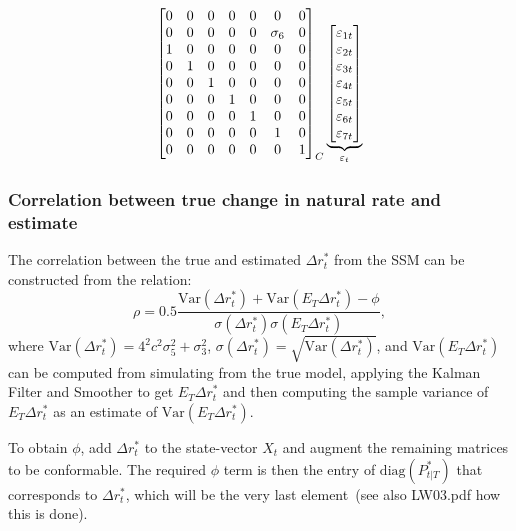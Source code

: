 \documentclass[a4paper,12pt]{article}
\begin{document}
\begin{align}
{\begin{bmatrix}
0 & 0 & 0 & 0 & 0 & 0 & 0 \\ 
0 & 0 & 0 & 0 & 0 & \sigma _{6} & 0 \\ 
1 & 0 & 0 & 0 & 0 & 0 & 0 \\ 
0 & 1 & 0 & 0 & 0 & 0 & 0 \\ 
0 & 0 & 1 & 0 & 0 & 0 & 0 \\ 
0 & 0 & 0 & 1 & 0 & 0 & 0 \\ 
0 & 0 & 0 & 0 & 1 & 0 & 0 \\ 
0 & 0 & 0 & 0 & 0 & 1 & 0 \\ 
0 & 0 & 0 & 0 & 0 & 0 & 1%
\end{bmatrix}%
}_{C}\underbrace{%
\begin{bmatrix}
\varepsilon _{1t} \\ 
\varepsilon _{2t} \\ 
\varepsilon _{3t} \\ 
\varepsilon _{4t} \\ 
\varepsilon _{5t} \\ 
\varepsilon _{6t} \\ 
\varepsilon _{7t}%
\end{bmatrix}%
}_{\varepsilon _{t}}
\end{align}%
\EAW\esq

\subsubsection{Correlation between true change in natural rate and estimate}

The correlation between the true and estimated $\Delta r_{t}^{\ast }$ from
the SSM can be constructed from the relation:%
\begin{equation}
\rho =0.5\frac{\mathrm{Var}(\Delta r_{t}^{\ast })+\mathrm{Var}(E_{T}\Delta
r_{t}^{\ast })-\phi }{\sigma (\Delta r_{t}^{\ast })\sigma (E_{T}\Delta
r_{t}^{\ast })},
\end{equation}
where $\mathrm{Var}(\Delta r_{t}^{\ast })=4^{2}c^{2}\sigma _{5}^{2}+\sigma
_{3}^{2}$, $\sigma (\Delta r_{t}^{\ast })=\sqrt{\mathrm{Var}(\Delta
r_{t}^{\ast })}$, and $\mathrm{Var}(E_{T}\Delta r_{t}^{\ast })$ can be
computed from simulating from the true model, applying the Kalman Filter and
Smoother to get $E_{T}\Delta r_{t}^{\ast }$ and then computing the sample
variance of $E_{T}\Delta r_{t}^{\ast }$ as an estimate of $\mathrm{Var}%
(E_{T}\Delta r_{t}^{\ast })$.

To obtain $\phi $, add $\Delta r_{t}^{\ast }$ to the state-vector $X_{t}$
and augment the remaining matrices to be conformable. The required $\phi $
term is then the entry of $\mathrm{diag}(P_{t|T}^{\ast })$ that corresponds
to $\Delta r_{t}^{\ast }$, which will be the very last element\ (see also
LW03.pdf how this is done).

\bigskip

\bigskip

\bigskip

\bigskip

\bigskip

\bigskip
\end{document}
